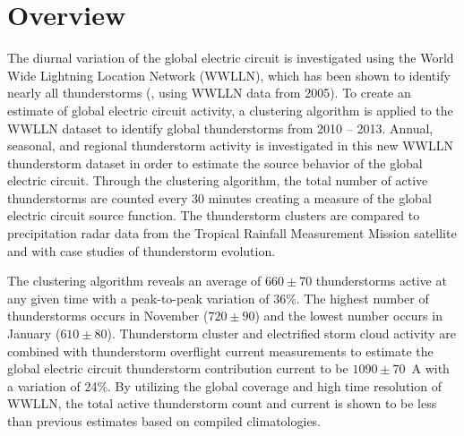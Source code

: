 \section{Overview}

The diurnal variation of the global electric circuit is investigated using the World Wide Lightning Location Network (WWLLN), which has been shown to identify nearly all thunderstorms (\citet{Jacobson2006c}, using WWLLN data from 2005).
To create an estimate of global electric circuit activity, a clustering algorithm is applied to the WWLLN dataset to identify global thunderstorms from 2010 -- 2013.
Annual, seasonal, and regional thunderstorm activity is investigated in this new WWLLN thunderstorm dataset in order to estimate the source behavior of the global electric circuit.
Through the clustering algorithm, the total number of active thunderstorms are counted every 30 minutes creating a measure of the global electric circuit source function.
The thunderstorm clusters are compared to precipitation radar data from the Tropical Rainfall Measurement Mission satellite and with case studies of thunderstorm evolution.

The clustering algorithm reveals an average of $660 \pm 70$ thunderstorms active at any given time with a peak-to-peak variation of 36\%.
The highest number of thunderstorms occurs in November ($720 \pm 90$) and the lowest number occurs in January ($610 \pm 80$).
Thunderstorm cluster and electrified storm cloud activity are combined with thunderstorm overflight current measurements to estimate the global electric circuit thunderstorm contribution current to be $1090 \pm 70$~A with a variation of 24\%.
By utilizing the global coverage and high time resolution of WWLLN, the total active thunderstorm count and current is shown to be less than previous estimates based on compiled climatologies.

